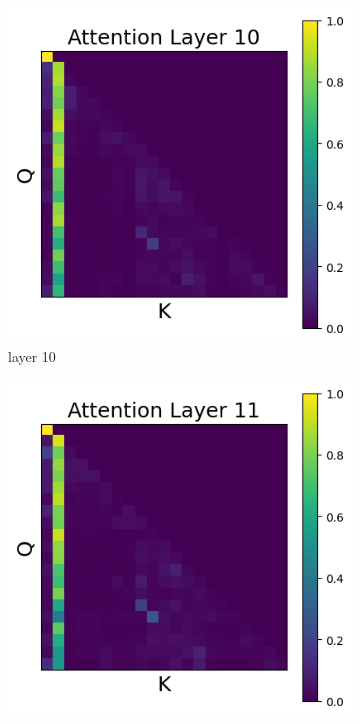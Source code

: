 \documentclass[11pt]{article}
\begin{document}
\begin{figure}[t]
    \begin{subfigure}[t]{0.24\textwidth}
    \centering
    \includegraphics[width=1.4\columnwidth]{figures/intervention3/layer_10.png}
    \caption{layer 10}
  \end{subfigure}\hfill
    \begin{subfigure}[t]{0.24\textwidth}
    \centering
    \includegraphics[width=1.4\columnwidth]{figures/intervention3/layer_11.png}

\end{subfigure}
\end{figure}
\end{document}
